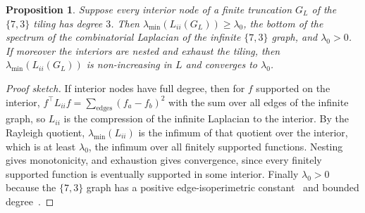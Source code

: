 \documentclass[11pt,a4paper]{article}
\newtheorem{proposition}{Proposition}
\begin{document}
\begin{proposition}
Suppose every interior node of a finite truncation $G_L$ of the $\{7,3\}$ tiling has degree $3$. Then
$\lambda_{\min}(L_{ii}(G_L))\ge\lambda_0$, the bottom of the spectrum of the combinatorial Laplacian of the infinite
$\{7,3\}$ graph, and $\lambda_0>0$. If moreover the interiors are nested and exhaust the tiling, then
$\lambda_{\min}(L_{ii}(G_L))$ is non-increasing in $L$ and converges to $\lambda_0$.
\end{proposition}
\begin{proof}[Proof sketch]
If interior nodes have full degree, then for $f$ supported on the interior,
$f^\top L_{ii} f = \sum_{\text{edges}}(f_a-f_b)^2$ with the sum over all edges of the infinite graph, so $L_{ii}$ is
the compression of the infinite Laplacian to the interior. By the Rayleigh quotient, $\lambda_{\min}(L_{ii})$ is the
infimum of that quotient over the interior, which is at least $\lambda_0$, the infimum over all finitely supported
functions. Nesting gives monotonicity, and exhaustion gives convergence, since every finitely supported function is
eventually supported in some interior. Finally $\lambda_0>0$ because the $\{7,3\}$ graph has a positive
edge-isoperimetric constant~\cite{HJL2002} and bounded degree~\cite{Dodziuk1984,Mohar1988}.
\end{proof}
\end{document}
